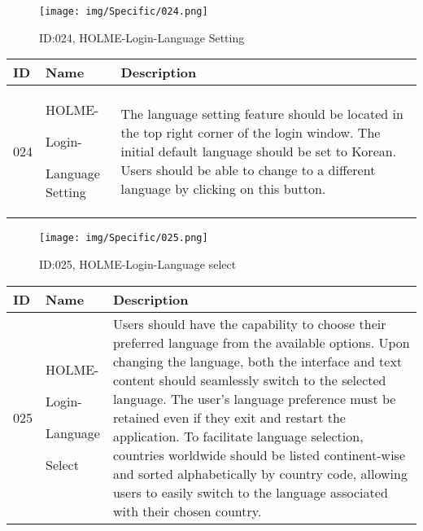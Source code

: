 \documentclass[conference]{IEEEtran}
\begin{document}
\begin{enumerate}
\begin{figure}[h]
\centering
\texttt{[image: img/Specific/024.png]}
\caption{ID:024, HOLME-Login-Language Setting}
\end{figure}
\begin{table}[h]
\def\arraystretch{1.2} \small
    \begin{tabular}{|p{1cm}|p{1.8cm}|p{5.0cm}|}
        \hline
        ID & Name & Description\\ \hline
         024 \par  & HOLME-\par Login-\par Language Setting &The language setting feature should be located in the top right corner of the login window. The initial default language should be set to Korean. Users should be able to change to a different language by clicking on this button.\\ \hline
    \end{tabular}
\end{table}

\begin{figure}[h]
\centering
\texttt{[image: img/Specific/025.png]}
\caption{ID:025, HOLME-Login-Language select}
\end{figure}
\begin{table}[h]
\def\arraystretch{1.2} \small
    \begin{tabular}{|p{1cm}|p{1.8cm}|p{5.0cm}|}
        \hline
        ID & Name & Description\\ \hline
         025 \par  & HOLME-\par Login-\par Language \par Select &Users should have the capability to choose their preferred language from the available options. Upon changing the language, both the interface and text content should seamlessly switch to the selected language. The user's language preference must be retained even if they exit and restart the application. To facilitate language selection, countries worldwide should be listed continent-wise and sorted alphabetically by country code, allowing users to easily switch to the language associated with their chosen country.\\ \hline
    \end{tabular}
\end{table}
\clearpage


\end{enumerate}
\end{document}
